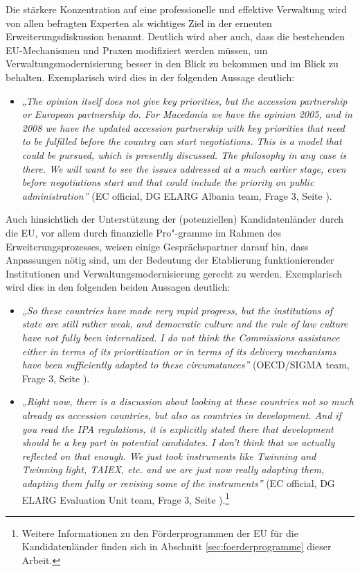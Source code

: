 Die stärkere Konzentration auf eine professionelle und effektive Verwaltung wird von allen befragten Experten als wichtiges Ziel in der erneuten Erweiterungsdiskussion benannt. Deutlich wird aber auch, dass die bestehenden EU-Mechanismen und Praxen modifiziert werden müssen, um Verwaltungsmodernisierung besser in den Blick zu bekommen und im Blick zu behalten. Exemplarisch wird dies in der folgenden Aussage deutlich: 
\begin{itemize}[label={}]
\item \textit{„The opinion itself does not give key priorities, but the accession partnership or European partnership do. For Macedonia we have the opinion 2005, and in 2008 we have the updated accession partnership with key priorities that need to be fulfilled before the country can start negotiations. This is a model that could be pursued, which is presently discussed. The philosophy in any case is there. We will want to see the issues addressed at a much earlier stage, even before negotiations start and that could include the priority on public administration”} (EC official, DG ELARG Albania team, Frage 3, Seite \pageref{sec:enlargement}).\end{itemize}
Auch hinsichtlich der Unterstützung der (potenziellen) Kandidatenländer durch die EU, vor allem durch finanzielle Pro"-gramme im Rahmen des Erweiterungsprozesses, weisen einige Gesprächspartner darauf hin, dass Anpassungen nötig sind, um der Bedeutung der Etablierung funktionierender Institutionen und Verwaltungsmodernisierung gerecht zu werden. Exemplarisch wird dies in den folgenden beiden Aussagen deutlich:
\begin{itemize}[label={}]
\item \textit{„So these countries have made very rapid progress, but the institutions of state are still rather weak, and democratic culture and the rule of law culture have not fully been internalized. I do not think the Commissions assistance either in terms of its prioritization or in terms of its delivery mechanisms have been sufficiently adapted to these circumstances”} (OECD/SIGMA team, Frage 3, Seite \pageref{sec:enlargement}).
\item \textit{„Right now, there is a discussion about looking at these countries not so much already as accession countries, but also as countries in development. And if you read the IPA regulations, it is explicitly stated there that development should be a key part in potential candidates. I don’t think that we actually reflected on that enough. We just took instruments like Twinning and Twinning light, TAIEX, etc. and we are just now really adapting them, adapting them fully or revising some of the instruments”} (EC official, DG ELARG Evaluation Unit team, Frage 3, Seite \pageref{sec:enlargement}).\footnote{Weitere Informationen zu den Förderprogrammen der EU für die Kandidatenländer finden sich in Abschnitt \ref{sec:foerderprogramme} dieser Arbeit.}
\end{itemize}
